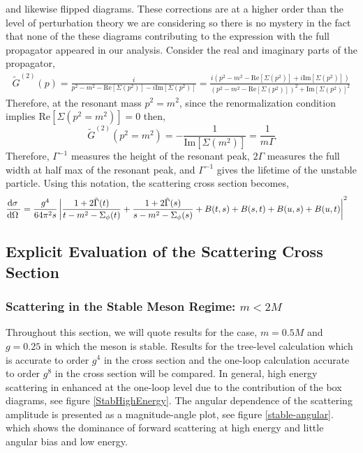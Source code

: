 \documentclass{article}
\begin{document}
and likewise flipped diagrams.
These corrections are at a higher order than the level of perturbation theory we are considering so there is no mystery in the fact that none of the these diagrams contributing to the expression with the full propagator appeared in our analysis.
Consider the real and imaginary parts of the propagator,
\begin{align*}
\tilde{G}^{(2)}(p) = \frac{i}{p^2 - m^2 - \mathrm{Re}[\Sigma(p^2)] - i \mathrm{Im}[\Sigma(p^2)]} = \frac{i(p^2 - m^2 - \mathrm{Re}[\Sigma(p^2)] + i \mathrm{Im}[\Sigma(p^2)])}{(p^2 - m^2 - \mathrm{Re}[\Sigma(p^2)])^2 + \mathrm{Im}[\Sigma(p^2)]^2}
\end{align*}
Therefore, at the resonant mass $p^2 = m^2$, since the renormalization condition implies $\mathrm{Re}[\Sigma(p^2 = m^2)] = 0$ then,
\[ \tilde{G}^{(2)}(p^2 = m^2) = - \frac{1}{\mathrm{Im}[\Sigma(m^2)]} = \frac{1}{m \Gamma} \]
Therefore, $\Gamma^{-1}$ measures the height of the resonant peak, $2 \Gamma$ measures the full width at half max of the resonant peak, and $\Gamma^{-1}$ gives the lifetime of the unstable particle.
Using this notation, the scattering cross section becomes, 
\begin{align*}
\frac{\mathrm{d}\sigma \:}{\mathrm{d}\Omega \:} 
&= \frac{g^4}{64 \pi^2 s} \left| \frac{1 + 2\tilde{\Gamma}(t)}{t - m^2 - \Sigma_\phi(t)} + \frac{1 + 2\tilde{\Gamma}(s)}{s - m^2 - \Sigma_\phi(s)} + B(t, s) + B(s, t) + B(u, s) + B(u, t)  \right|^2 
\end{align*}

\subsection{Explicit Evaluation of the Scattering Cross Section}

\subsubsection{Scattering in the Stable Meson Regime: $m < 2 M$}
Throughout this section, we will quote results for the case, $m = 0.5M$ and $g = 0.25$ in which the meson is stable. Results for the tree-level calculation which is accurate to order $g^4$ in the cross section and the one-loop calculation accurate to order $g^8$ in the cross section will be compared. In general, high energy scattering in enhanced at the one-loop level due to the contribution of the box diagrams, see figure \ref{StabHighEnergy}. The angular dependence of the scattering amplitude is presented as a magnitude-angle plot, see figure \ref{stable-angular}. which shows the dominance of forward scattering at high energy and little angular bias and low energy.
\end{document}
